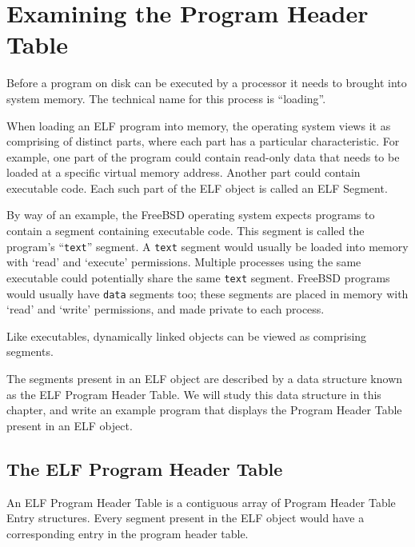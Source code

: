 \documentclass[a4paper,pdftex]{book}
\newcommand{\filename}[1]{\texttt{#1}}
\newcommand{\trade}{\texttrademark\xspace}
\newcommand{\elfdatastructure}[1]{\textsf{#1}}
\begin{document}
\chapter{Examining the Program Header Table}\label{chap.elf-phdr}

Before a program on disk can be executed by a processor it needs to
brought into system memory. The technical name for this process is
``loading''.

When loading an ELF program into memory, the operating system views it
as comprising of distinct parts, where each part has a particular
characteristic. For example, one part of the program could contain
read-only data that needs to be loaded at a specific virtual memory
address. Another part could contain executable code.
Each such part of the ELF object is called an ELF
\elfdatastructure{Segment}.

By way of an example, the FreeBSD\trade operating system expects
programs to contain a segment containing executable
code. This segment is called the
program's ``\filename{text}'' segment. A \filename{text} segment would
usually be loaded into memory with `read' and `execute' permissions.
Multiple processes using the same executable could potentially share
the same \filename{text} segment.  FreeBSD programs would usually have
\filename{data} segments too; these segments are placed in memory with
`read' and `write' permissions, and made private to each process.

Like executables, dynamically linked objects can be viewed as
comprising segments.

The segments present in an ELF object are described by a data
structure known as the ELF \elfdatastructure{Program Header
  Table}. We will study this data
structure in this chapter, and write an example program that displays
the \elfdatastructure{Program Header Table} present in an ELF object.

\section{The ELF Program Header Table}

An ELF \elfdatastructure{Program Header Table} is a contiguous array
of \elfdatastructure{Program Header Table Entry} structures.  Every
segment present in the ELF object would have a corresponding entry in
the program header table.
\end{document}
